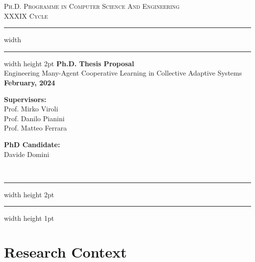 \documentclass[12pt]{article}
\begin{document}
\begin{titlepage}

	\newcommand{\HRule}{\rule{\linewidth}{0.5mm}}
	\center
	
	\textsc{\Large Ph.D. Programme in Computer Science And Engineering}\\[0.5cm]
	
	\textsc{\Large XXXIX Cycle}\\[0.6cm]
	
	\hrule width \hsize \kern 1mm \hrule width \hsize height 2pt 
	\vspace{0.8cm}
	{ \large \bfseries Ph.D. Thesis Proposal}\\[0.6cm]
	{ \large Engineering Many-Agent Cooperative Learning in Collective Adaptive Systems }\\[0.6cm]

	\bfseries{February, 2024}


    \vspace{1.5cm}
    
    \noindent
    \begin{minipage}[t]{0.45\textwidth}
        \raggedright
        \textbf{Supervisors:}\\[0.5cm]
        Prof. Mirko Viroli\\
        Prof. Danilo Pianini\\
        Prof. Matteo Ferrara
    \end{minipage}%
    \hfill
    \begin{minipage}[t]{0.45\textwidth}
        \raggedleft
        \textbf{PhD Candidate:}\\[0.5cm]
        Davide Domini
    \end{minipage} \\[0.6cm]

	\hrule width \hsize height 2pt \kern 1mm \hrule width \hsize height 1pt
	\vspace{0.4cm}

\end{titlepage}

\section{Research Context}\label{sec:intro}
\end{document}
